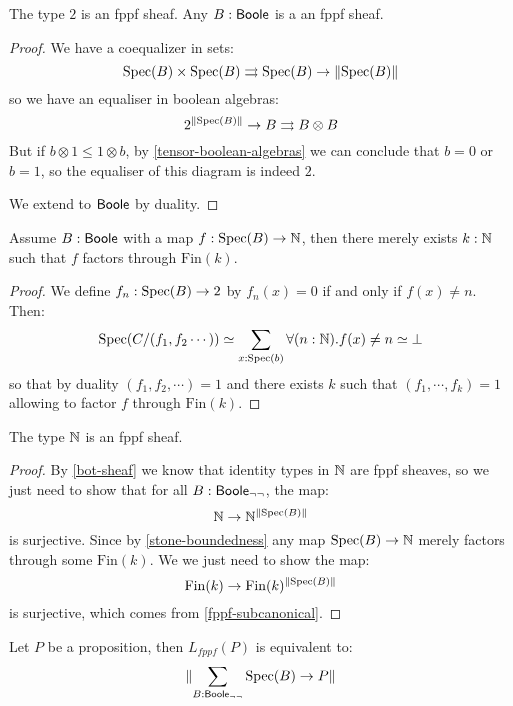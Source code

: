 \begin{lemma}\label{fppf-subcanonical}
The type ${2}$ is an fppf sheaf. Any $B:\mathsf{Boole}$ is a an fppf sheaf.
\end{lemma}

\begin{proof}
We have a coequalizer in sets:
\[\operatorname{Spec}(B)\times\operatorname{Spec}(B) \rightrightarrows \operatorname{Spec}(B)\to \lVert \operatorname{Spec}(B) \rVert \]
so we have an equaliser in boolean algebras:
\[ {2}^{\lVert \operatorname{Spec}(B) \rVert}\to B\rightrightarrows B\otimes B \]
But if $b\otimes 1 \leq 1\otimes b$, by \cref{tensor-boolean-algebras} we can conclude that $b=0$ or $b=1$, so the equaliser of this diagram is indeed ${2}$.

We extend to $\mathsf{Boole}$ by duality.
\end{proof}

\begin{lemma}\label{stone-boundedness}
Assume $B:\mathsf{Boole}$ with a map $f:\operatorname{Spec}(B)\to\mathbb{N}$, then there merely exists $k:\mathbb{N}$ such that $f$ factors through $\mathrm{Fin}(k)$.
\end{lemma}

\begin{proof}
We define $f_n:\operatorname{Spec}(B)\to {2}$ by $f_n(x) = 0$ if and only if $f(x)\not=n$. Then:
\[\operatorname{Spec}(C/(f_1,f_2\cdots)) \simeq \sum_{x:\operatorname{Spec}(b)}\forall (n:\mathbb{N}). f(x)\not=n \simeq \bot\]
so that by duality $(f_1,f_2,\cdots) = 1$ and there exists $k$ such that $(f_1,\cdots,f_k)=1$ allowing to factor $f$ through $\mathrm{Fin}(k)$.
\end{proof}

\begin{lemma}\label{nat-sheaf}
The type $\mathbb{N}$ is an fppf sheaf.
\end{lemma}

\begin{proof}
By \cref{bot-sheaf} we know that identity types in $\mathbb{N}$ are fppf sheaves, so we just need to show that for all $B:\mathsf{Boole}_{\neg\neg}$, the map:
\[\mathbb{N}\to \mathbb{N}^{\lVert \operatorname{Spec}(B) \rVert}\]
is surjective. Since by \cref{stone-boundedness} any map $\operatorname{Spec}(B)\to \mathbb{N}$ merely factors through some $\mathrm{Fin}(k)$. We we just need to show the map:
\[\mathrm{Fin}(k)\to \mathrm{Fin}(k)^{\lVert \operatorname{Spec}(B) \rVert}\]
is surjective, which comes from \cref{fppf-subcanonical}.
\end{proof}

\begin{lemma}\label{proposition-fppf-sheaf}
Let $P$ be a proposition, then $L_{fppf}(P)$ is equivalent to:
\[\lVert \sum_{B:\mathsf{Boole}_{\neg\neg}} \operatorname{Spec}(B)\to P \rVert\]
\end{lemma}

